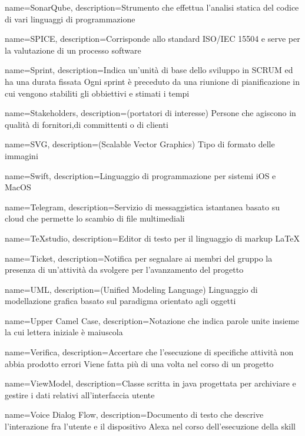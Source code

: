 {
name={SonarQube},
description={Strumento che effettua l’analisi statica del codice di vari linguaggi di programmazione}
}

{
name={SPICE},
description={Corrisponde allo standard ISO/IEC 15504 e serve per la valutazione di un processo software}
}

{
name={Sprint},
description={Indica un’unità di base dello sviluppo in SCRUM ed ha una durata fissata Ogni sprint è preceduto da una riunione di pianificazione in cui vengono stabiliti gli obbiettivi e stimati i tempi}
}

{
name={Stakeholders},
description={(portatori di interesse) Persone che agiscono in qualità di fornitori,di committenti o di clienti}
}

{
name={SVG},
description={(Scalable Vector Graphics) Tipo di formato delle immagini}
}

{
name={Swift},
description={Linguaggio di programmazione per sistemi iOS e MacOS}
}

{
name={Telegram},
description={Servizio di messaggistica istantanea basato su cloud che permette lo scambio di file multimediali}
}

{
name={TeXstudio},
description={Editor di testo per il linguaggio di markup \LaTeX}
}

{
name={Ticket},
description={Notifica per segnalare ai membri del gruppo la presenza di un’attività da svolgere per l’avanzamento del progetto}
}

{
name={UML},
description={(Unified Modeling Language) Linguaggio di modellazione grafica basato sul paradigma orientato agli oggetti}
}

{
name={Upper Camel Case},
description={Notazione che indica parole unite insieme la cui lettera iniziale è maiuscola}
}

{
name={Verifica},
description={Accertare che l’esecuzione di specifiche attività non abbia prodotto errori Viene fatta più di una volta nel corso di un progetto}
}

{
	name={ViewModel},
	description={Classe scritta in java progettata per archiviare e gestire i dati relativi all'interfaccia utente}
}

{
name={Voice Dialog Flow},
description={Documento di testo che descrive l'interazione fra l'utente e il dispositivo Alexa nel corso dell'esecuzione della skill}
}

